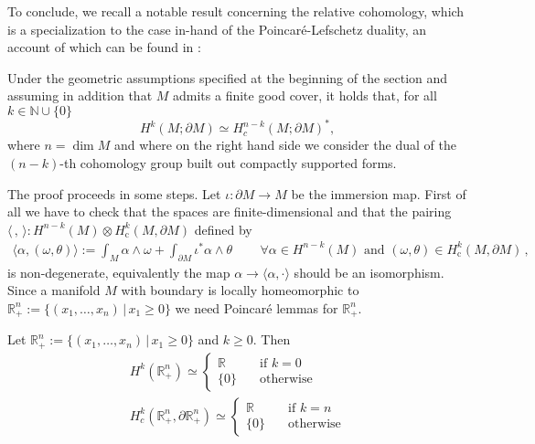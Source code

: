 \noindent To conclude, we recall a notable result concerning the relative cohomology, which is a specialization to the case in-hand of the Poincar\'e-Lefschetz duality, an account of which can be found in \cite{Maunder}:
\begin{theorem}\label{Prop: Poin-Lefs duality}
	Under the geometric assumptions specified at the beginning of the section and assuming in addition that $M$ admits a finite good cover, it holds that, for all $k\in\mathbb{N}\cup\{0\}$
	$$H^k(M;\partial M)\simeq H^{n-k}_c(M;\partial M)^*,$$
	where $n=\dim M$ and where on the right hand side we consider the dual of the $(n-k)$-th cohomology group built out compactly supported forms.
\end{theorem}
\vspace{0.3cm}
The proof proceeds in some steps. Let $\iota:\partial M\to M$ be the immersion map. First of all we have to check that the spaces are finite-dimensional and that the pairing $\langle \,,\,\rangle:H^{n-k}(M)\otimes H_{\mathrm{c}}^{k}(M,\partial M)$ defined by
\begin{align}
\langle\alpha,(\omega,\theta)\rangle:=\int_M\alpha\wedge\omega+\int_{\partial M}\iota^*\alpha\wedge \theta\,\qquad\forall\alpha\in H^{n-k}(M)\text{ and } (\omega,\theta)\in H_{\mathrm{c}}^{k}(M,\partial M)\,,
\label{eq:dualitypair}
\end{align}
is non-degenerate, equivalently the map $\alpha\to\langle\alpha,\cdot\rangle$ should be an isomorphism.\\

Since a manifold $M$ with boundary is locally homeomorphic to $\mathbb{R}^n_+:=\{(x_1,\dots,x_n)\,|\, x_1\geq 0\}$ we need Poincar\'e lemmas for $\mathbb{R}^n_+$.


\begin{lemma}
	Let $\mathbb{R}^n_+:=\{(x_1,\dots,x_n)\,|\, x_1\geq 0\}$ and $k\geq 0$. Then
	\begin{align}
	H^k(\mathbb{R}^n_+)\simeq\begin{cases}
	\mathbb{R}\quad &\text{if }k=0\\
	\{0\}\quad &\text{otherwise}
	\end{cases}\\
	H^k_c(\mathbb{R}^n_+,\partial\mathbb{R}^n_+)\simeq\begin{cases}
	\mathbb{R}\quad &\text{if }k=n\\
	\{0\}\quad &\text{otherwise}
	\end{cases}
	\end{align}
\end{lemma}

